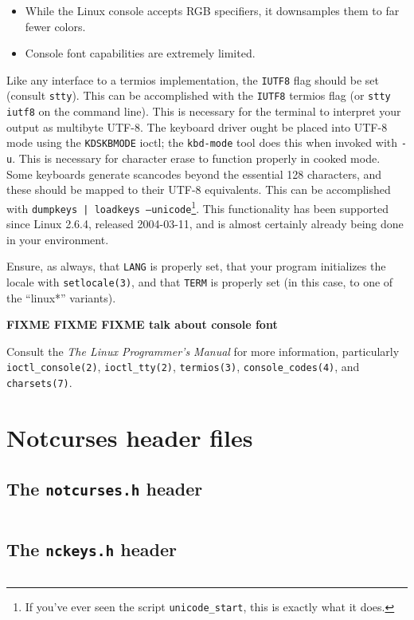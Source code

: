\documentclass[letterpaper,10pt]{article}
\newenvironment{denseitemize}{
  \begin{itemize}
      \setlength{\itemsep}{0pt}
}{
  \end{itemize}
}
\begin{document}
\begin{appendices}
\begin{denseitemize}
\item{While the Linux console accepts RGB specifiers, it downsamples them to
    far fewer colors.}
\item{Console font capabilities are extremely limited.}
\end{denseitemize}

Like any interface to a termios\cite{termios} implementation, the \texttt{IUTF8}
flag should be set (consult \texttt{stty}). This can be accomplished with the
\texttt{IUTF8} termios flag (or \texttt{stty iutf8} on the command line). This
is necessary for the terminal to interpret your output as multibyte UTF-8. The
keyboard driver ought be placed into UTF-8 mode using the \texttt{KDSKBMODE}
ioctl; the \texttt{kbd-mode} tool does this when invoked with \texttt{-u}.
This is necessary for character erase to function properly in cooked mode. Some
keyboards generate scancodes beyond the essential 128 characters, and these
should be mapped to their UTF-8 equivalents. This can be accomplished with
\texttt{dumpkeys | loadkeys --unicode}\footnote{If you've ever seen the script
\texttt{unicode\_start}, this is exactly what it does.}. This functionality has
been supported since Linux 2.6.4, released 2004-03-11, and is almost certainly
already being done in your environment.

Ensure, as always, that \texttt{LANG} is properly set, that your program
initializes the locale with \texttt{setlocale(3)}, and that \texttt{TERM} is
properly set (in this case, to one of the ``linux*'' variants).

\textbf{FIXME FIXME FIXME talk about console font}

Consult the \textit{The Linux Programmer's Manual} for more information,
particularly
\texttt{ioctl\_console(2)}\cite{ioctlconsole},
\texttt{ioctl\_tty(2)}\cite{ioctltty},
\texttt{termios(3)}\cite{termios},
\texttt{console\_codes(4)}\cite{consolecodes},
and
\texttt{charsets(7)}\cite{charsets7}.

\newpage

\section{Notcurses header files}
\subsection{The \texttt{notcurses.h} header}
\bgroup
\inputminted[linenos,breaklines=true]{C}{code/notcurses.h}
\egroup

\subsection{The \texttt{nckeys.h} header}
\bgroup
\inputminted[linenos,breaklines=true]{C}{code/nckeys.h}
\egroup

\end{appendices}
\end{document}

